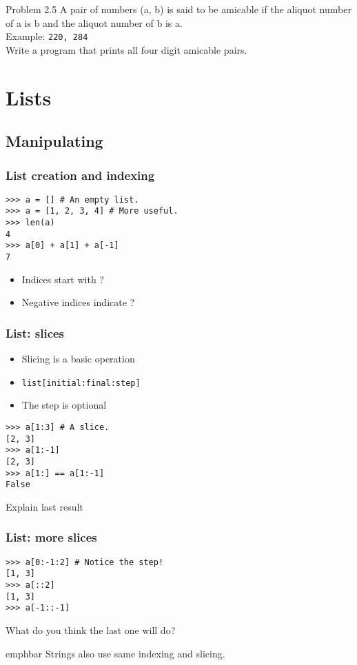 \documentclass[14pt,compress]{beamer}
\newcommand{\emphbar}[1]
{\begin{beamercolorbox}[rounded=true]{emphbar} 
      {#1}
 \end{beamercolorbox}
}
\newcounter{time}
\newcommand{\inctime}[1]{\addtocounter{time}{#1}{\tiny \thetime\ m}}
\newcommand{\typ}[1]{\texttt{#1}}
\begin{document}
\begin{frame}{Problem 2.5}
  A pair of numbers (a, b) is said to be \alert{amicable} if the aliquot number of a is b and the aliquot number of b is a.\\
  Example: \texttt{220, 284}\\
  Write a program that prints all four digit amicable pairs.
  \inctime{25}
\end{frame}


\section{Lists}

\subsection{Manipulating}
\begin{frame}[fragile]
  \frametitle{List creation and indexing}
\begin{lstlisting}
>>> a = [] # An empty list.
>>> a = [1, 2, 3, 4] # More useful.
>>> len(a) 
4
>>> a[0] + a[1] + a[-1]
7
\end{lstlisting}
  \begin{itemize}
  \item Indices start with ?
  \item Negative indices indicate ?
  \end{itemize}
\end{frame}

\begin{frame}[fragile]
  \frametitle{List: slices}
  \begin{itemize}
  \item Slicing is a basic operation
  \item \typ{list[initial:final:step]}
  \item  The step is optional
  \end{itemize}
\begin{lstlisting}
>>> a[1:3] # A slice.
[2, 3]
>>> a[1:-1]
[2, 3]
>>> a[1:] == a[1:-1]
False  
\end{lstlisting}
Explain last result
\end{frame}

\begin{frame}[fragile]
  \frametitle{List: more slices}
\begin{lstlisting}
>>> a[0:-1:2] # Notice the step!
[1, 3]
>>> a[::2]
[1, 3]
>>> a[-1::-1]
\end{lstlisting}
What do you think the last one will do?
  \emphbar{Strings also use same indexing and slicing.}
\end{frame}
\end{document}
